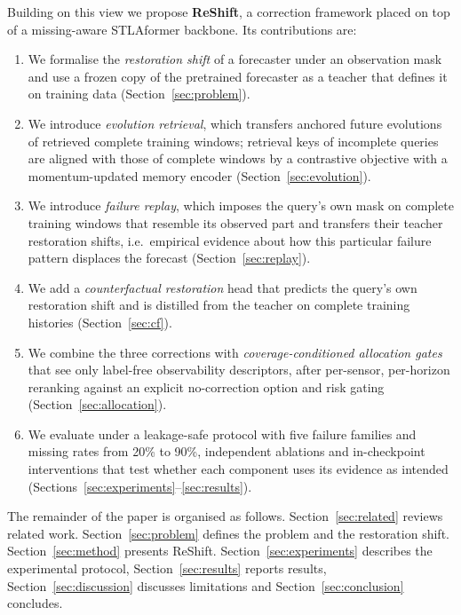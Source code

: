 Building on this view we propose \textbf{ReShift}, a correction framework placed on top of a missing-aware STLAformer backbone. Its contributions are:
\begin{enumerate}[leftmargin=*,label=(\arabic*)]
\item We formalise the \emph{restoration shift} of a forecaster under an observation mask and use a frozen copy of the pretrained forecaster as a teacher that defines it on training data (Section~\ref{sec:problem}).
\item We introduce \emph{evolution retrieval}, which transfers anchored future evolutions of retrieved complete training windows; retrieval keys of incomplete queries are aligned with those of complete windows by a contrastive objective with a momentum-updated memory encoder (Section~\ref{sec:evolution}).
\item We introduce \emph{failure replay}, which imposes the query's own mask on complete training windows that resemble its observed part and transfers their teacher restoration shifts, i.e.\ empirical evidence about how this particular failure pattern displaces the forecast (Section~\ref{sec:replay}).
\item We add a \emph{counterfactual restoration} head that predicts the query's own restoration shift and is distilled from the teacher on complete training histories (Section~\ref{sec:cf}).
\item We combine the three corrections with \emph{coverage-conditioned allocation gates} that see only label-free observability descriptors, after per-sensor, per-horizon reranking against an explicit no-correction option and risk gating (Section~\ref{sec:allocation}).
\item We evaluate under a leakage-safe protocol with five failure families and missing rates from 20\% to 90\%, independent ablations and in-checkpoint interventions that test whether each component uses its evidence as intended (Sections~\ref{sec:experiments}--\ref{sec:results}).
\end{enumerate}

The remainder of the paper is organised as follows. Section~\ref{sec:related} reviews related work. Section~\ref{sec:problem} defines the problem and the restoration shift. Section~\ref{sec:method} presents ReShift. Section~\ref{sec:experiments} describes the experimental protocol, Section~\ref{sec:results} reports results, Section~\ref{sec:discussion} discusses limitations and Section~\ref{sec:conclusion} concludes.

